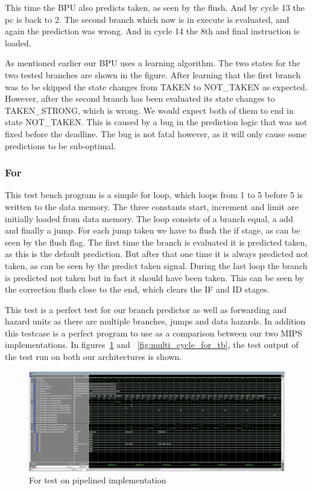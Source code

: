 This time the BPU also predicts taken, as seen by the flush. And by cycle 13 
the pc is back to 2. The second branch which now is in execute is evaluated,
and again the prediction was wrong. And in cycle 14 the 8th and final instruction
is loaded.

As mentioned earlier our BPU uses a learning algorithm. The two states for
the two tested branches are shown in the figure. After learning that the first
branch was to be skipped the state changes from TAKEN to NOT\_TAKEN as expected.
However, after the second branch has been evaluated its state changes to TAKEN\_STRONG,
which is wrong. We would expect both of them to end in state NOT\_TAKEN. 
This is caused by a bug in the prediction logic that was not fixed before the deadline.
The bug is not fatal however, as it will only cause some predictions to be sub-optimal.

\subsubsection{For} 
\label{section:for-tb}
This test bench program is a simple for loop, which loops from 1 to 5 before 5 is
written to the data memory. The three constants start, increment and limit are 
initially loaded from data memory.
The loop consists of a branch equal, a add and finally a jump. For each jump taken we
have to flush the if stage, as can be seen by the flush flag. The first time the branch
is evaluated it is predicted taken, as this is the default prediction. But after that one
time it is always predicted not taken, as can be seen by the predict taken signal. During
the last loop the branch is predicted not taken but in fact it should have been taken.
This can be seen by the correction flush close to the end, which clears the IF and ID stages.

This test is a perfect test for our branch predictor as well as forwarding and hazard units
as there are multiple branches, jumps and data hazards. In addition
this testcase is a perfect program to use as a comparison between our two MIPS
implementations. In figures~\ref{fig:for_tb} and ~\ref{fig:multi_cycle_for_tb}, the test output of the test run on both our architectures is shown.

\begin{figure}[h]
        \centerline{\includegraphics[width=590px]{figures/tb/for_tb2}}
        \caption{For test on pipelined implementation}
        \label{fig:for_tb}
\end{figure}

